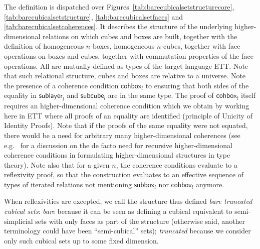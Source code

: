 \documentclass[10pt, titlepage]{amsart}
\newcommand{\sort}[1]{\ensuremath{\mathsf{U}_{#1}}}
\newcommand{\unittype}{\ensuremath{\mathsf{unit}}}
\newcommand{\defeq}{\ensuremath{\triangleq}}
\newcommand{\downbox}[2]{\ensuremath{\mathsf{subbox}_{#1}^{#2}}}
\newcommand{\downlayer}[2]{\ensuremath{\mathsf{sublayer}_{#1}^{#2}}}
\newcommand{\downcube}[2]{\ensuremath{\mathsf{subcube}_{#1}^{#2}}}
\newcommand{\myfullbox}[2]{\ensuremath{\mathsf{fullbox}_{#1}^{#2}}}
\newcommand{\cohbox}[2]{\ensuremath{\mathsf{cohbox}_{#1}^{#2}}}
\newcommand{\partialcubset}[2]{\ensuremath{\mathsf{cubset}_{#1}^{<#2}}}
\newcommand{\mycubsetcomp}[2]{\ensuremath{\mathsf{cubset}_{#1}^{=#2}}}
\newcommand{\imp}{\ensuremath{\rightarrow}}
\newcommand{\eqnline}[4]{$#1$ & $#2$ & $#3$ & $#4$ \\}
\newcommand{\mc}[1]{\multicolumn{4}{c}{\textit{#1}} \\\\}
\begin{document}
The definition is dispatched over Figures~\ref{tab:barecubicalsetstructurecore}, \ref{tab:barecubicalsetstructure}, \ref{tab:barecubicalsetfaces} and \ref{tab:barecubicalsetcoherences}. It describes the structure of the underlying higher-dimensional relations on which cubes and boxes are built, together with the definition of homogeneous $n$-boxes, homogeneous $n$-cubes, together with face operations on boxes and cubes, together with commutation properties of the face operations. All are mutually defined as types of the target language ETT. Note that such relational structure, cubes and boxes are relative to a universe. Note the presence of a coherence condition $\cohbox{l}{}$ to ensuring that both sides of the equality in $\downlayer{l}{}$ and $\downcube{l}{}$ are in the same type. The proof of $\cohbox{l}{}$ itself requires an higher-dimensional coherence condition which we obtain by working here in ETT where all proofs of an equality are identified (principle of Unicity of Identity Proofs). Note that if the proofs of the same equality were not equated, there would be a need for arbitrary many higher-dimensional coherences (see e.g.~\cite{Herbelin15} for a discussion on the de facto need for recursive higher-dimensional coherence conditions in formulating higher-dimensional structures in type theory). Note also that for a given $n$, the coherence conditions evaluate to a reflexivity proof, so that the construction evaluates to an effective sequence of types of iterated relations not mentioning $\downbox{l}{}$ nor $\cohbox{l}{}$ anymore.

When reflexivities are excepted, we call the structure thus defined \emph{bare truncated cubical sets}: \emph{bare} because it can be seen as defining a cubical equivalent to semi-simplicial sets with only faces as part of the structure (otherwise said, another terminology could have been ``semi-cubical'' sets); \emph{truncated} because we consider only such cubical sets up to some fixed dimension.

\end{document}
